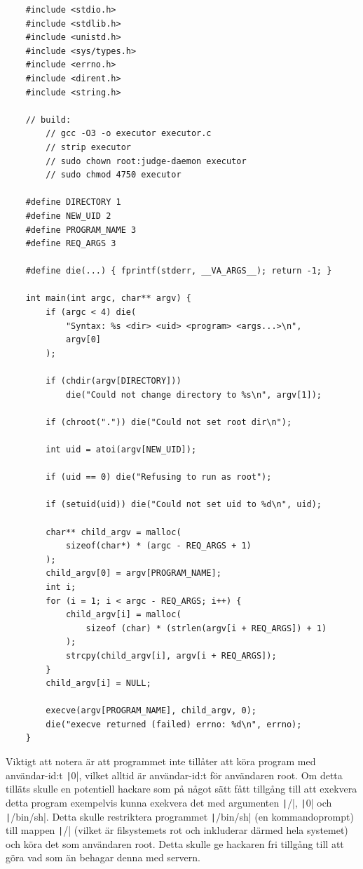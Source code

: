 \documentclass{article}
\begin{document}
\begin{verbatim}
	#include <stdio.h>
	#include <stdlib.h>
	#include <unistd.h>
	#include <sys/types.h>
	#include <errno.h>
	#include <dirent.h>
	#include <string.h>

	// build:
		// gcc -O3 -o executor executor.c
		// strip executor
		// sudo chown root:judge-daemon executor
		// sudo chmod 4750 executor

	#define DIRECTORY 1
	#define NEW_UID 2
	#define PROGRAM_NAME 3
	#define REQ_ARGS 3

	#define die(...) { fprintf(stderr, __VA_ARGS__); return -1; }

	int main(int argc, char** argv) {
		if (argc < 4) die(
			"Syntax: %s <dir> <uid> <program> <args...>\n",
			argv[0]
		);

		if (chdir(argv[DIRECTORY]))
			die("Could not change directory to %s\n", argv[1]);

		if (chroot(".")) die("Could not set root dir\n");

		int uid = atoi(argv[NEW_UID]);

		if (uid == 0) die("Refusing to run as root");

		if (setuid(uid)) die("Could not set uid to %d\n", uid);

		char** child_argv = malloc(
			sizeof(char*) * (argc - REQ_ARGS + 1)
		);
		child_argv[0] = argv[PROGRAM_NAME];
		int i;
		for (i = 1; i < argc - REQ_ARGS; i++) {
			child_argv[i] = malloc(
				sizeof (char) * (strlen(argv[i + REQ_ARGS]) + 1)
			);
			strcpy(child_argv[i], argv[i + REQ_ARGS]);
		}
		child_argv[i] = NULL;

		execve(argv[PROGRAM_NAME], child_argv, 0);
		die("execve returned (failed) errno: %d\n", errno);
	}
\end{verbatim}

Viktigt att notera är att programmet inte tillåter att köra program med
användar-id:t \texttt|0|, vilket alltid är användar-id:t
för användaren root. Om detta tilläts skulle en potentiell hackare som på något
sätt fått tillgång till att exekvera detta program exempelvis kunna exekvera det
med argumenten \texttt|/|,
\texttt|0| och \texttt|/bin/sh|.
Detta skulle restriktera programmet \texttt|/bin/sh| (en
kommandoprompt) till mappen \texttt|/| (vilket är
filsystemets rot och inkluderar därmed hela systemet) och köra det som
användaren root. Detta skulle ge hackaren fri tillgång till att göra vad som än
behagar denna med servern.
\end{document}
